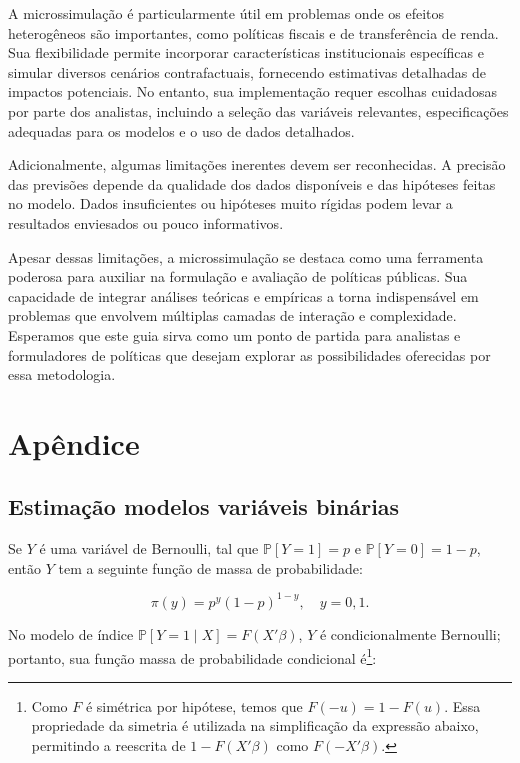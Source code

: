 \documentclass[12pt]{article}
\theoremstyle{break}
\begin{document}
A microssimulação é particularmente útil em problemas onde os efeitos heterogêneos são importantes, como políticas fiscais e de transferência de renda. Sua flexibilidade permite incorporar características institucionais específicas e simular diversos cenários contrafactuais, fornecendo estimativas detalhadas de impactos potenciais. No entanto, sua implementação requer escolhas cuidadosas por parte dos analistas, incluindo a seleção das variáveis relevantes, especificações adequadas para os modelos e o uso de dados detalhados.

Adicionalmente, algumas limitações inerentes devem ser reconhecidas. A precisão das previsões depende da qualidade dos dados disponíveis e das hipóteses feitas no modelo. Dados insuficientes ou hipóteses muito rígidas podem levar a resultados enviesados ou pouco informativos. 

Apesar dessas limitações, a microssimulação se destaca como uma ferramenta poderosa para auxiliar na formulação e avaliação de políticas públicas. Sua capacidade de integrar análises teóricas e empíricas a torna indispensável em problemas que envolvem múltiplas camadas de interação e complexidade. Esperamos que este guia sirva como um ponto de partida para analistas e formuladores de políticas que desejam explorar as possibilidades oferecidas por essa metodologia.






\section{Apêndice}


\subsection{Estimação modelos variáveis binárias}

 Se \( Y \) é uma variável de Bernoulli, tal que \( \mathbb{P}[Y = 1] = p \) e \( \mathbb{P}[Y = 0] = 1 - p \), então \( Y \) tem a seguinte função de massa de probabilidade:

\[
\pi(y) = p^y (1 - p)^{1 - y}, \quad y = 0, 1.
\]

No modelo de índice \( \mathbb{P}[Y = 1 \mid {X}] = F({X}'{\beta}) \), \( Y \) é condicionalmente Bernoulli; portanto, sua função massa de probabilidade condicional é\footnote{Como \( F \) é simétrica por hipótese, temos que \( F(-u) = 1 - F(u) \). Essa propriedade da simetria é utilizada na simplificação da expressão abaixo, permitindo a reescrita de \( 1 - F({X}'{\beta}) \) como \( F(-{X}'{\beta}) \).}:
\end{document}
